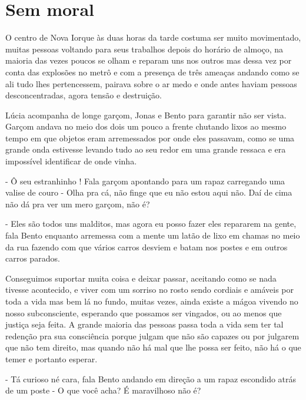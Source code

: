 
\chapter{Sem moral}
	    


O centro de Nova Iorque às duas horas da tarde costuma ser muito movimentado, muitas pessoas voltando para seus trabalhos depois do horário de almoço, na maioria das vezes poucos se olham e reparam uns nos outros mas dessa vez por conta das explosões no metrô e com a presença de três ameaças andando como se ali tudo lhes pertencessem, pairava sobre o ar medo e onde antes haviam pessoas desconcentradas, agora tensão e destruição.

Lúcia acompanha de longe garçom, Jonas e Bento para garantir não ser vista. Garçom andava no meio dos dois um pouco a frente chutando lixos ao mesmo tempo em que objetos eram arremessados por onde eles passavam, como se uma grande onda estivesse levando tudo ao seu redor em uma grande ressaca e era impossível identificar de onde vinha. 

- Ô seu estranhinho ! Fala garçom apontando para um rapaz carregando uma valise de couro - Olha pra cá, não finge que eu não estou aqui não. Daí de cima não dá pra ver um mero garçom, não é?

- Eles são todos uns malditos, mas agora eu posso fazer eles repararem na gente, fala Bento enquanto arremessa com a mente um latão de lixo em chamas no meio da rua fazendo com que vários carros desviem e batam nos postes e em outros carros parados.

Conseguimos suportar muita coisa e deixar passar, aceitando como se nada tivesse acontecido, e viver com um sorriso no rosto sendo cordiais e amáveis por toda a vida mas bem lá no fundo, muitas vezes, ainda existe a mágoa vivendo no nosso subconsciente, esperando que possamos ser vingados, ou ao menos que justiça seja feita. A grande maioria das pessoas passa toda a vida sem ter tal redenção pra sua consciência porque julgam que não são capazes ou por julgarem que não tem direito, mas quando não há mal que lhe possa ser feito, não há o que temer e portanto esperar.

- Tá curioso né cara, fala Bento andando em direção a um rapaz escondido atrás de um poste - O que você acha? É maravilhoso não é?

